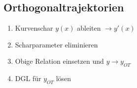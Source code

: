 \subsection{Orthogonaltrajektorien}
    \begin{enumerate}
        \item Kurvenschar $y(x)$ ableiten $\to y'(x)$
        \item Scharparameter eliminieren
        \item Obige Relation einsetzen und $y \to y_{OT}$
        \item DGL für $y_{OT}$ lösen
    \end{enumerate}